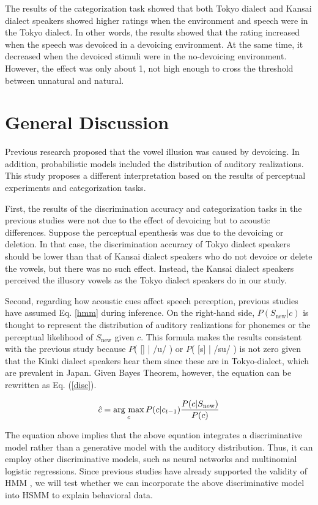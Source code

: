 \documentclass[a4paper,11pt,twocolumn]{article}
\newcommand{\argmax}{\mathop{\rm arg~max}\limits}
\begin{document}
The results of the categorization task showed that both Tokyo dialect and Kansai dialect speakers showed higher ratings when the environment and speech were in the Tokyo dialect. In other words, the results showed that the rating increased when the speech was devoiced in a devoicing environment. At the same time, it decreased when the devoiced stimuli were in the no-devoicing environment. However, the effect was only about 1, not high enough to cross the threshold between unnatural and natural.

\section{General Discussion}

Previous research proposed that the vowel illusion was caused by devoicing. In addition, probabilistic models included the distribution of auditory realizations. This study proposes a different interpretation based on the results of perceptual experiments and categorization tasks.

First, the results of the discrimination accuracy and categorization tasks in the previous studies were not due to the effect of devoicing but to acoustic differences. Suppose the perceptual epenthesis was due to the devoicing or deletion. In that case, the discrimination accuracy of Tokyo dialect speakers should be lower than that of Kansai dialect speakers who do not devoice or delete the vowels, but there was no such effect. Instead, the Kansai dialect speakers perceived the illusory vowels as the Tokyo dialect speakers do in our study.

Second, regarding how acoustic cues affect speech perception, previous studies \cite{wilson2013bayesian, kishiyama2021influence} have assumed Eq. \ref{hmm} during inference. On the right-hand side, $P(S_{\text{new}}|c)$ is thought to represent the distribution of auditory realizations for phonemes or the perceptual likelihood of $S_{\text{new}}$ given $c$. This formula makes the results consistent with the previous study because $P$( [\textsubring{\textturnm}] | /u/ ) or $P$( [s] | /su/ ) is not zero given that the Kinki dialect speakers hear them since these are in Tokyo-dialect, which are prevalent in Japan. Given Bayes Theorem, however, the equation can be rewritten as Eq. (\ref{disc}).

\begin{equation} \label{disc}
    \hat{c} = \argmax_{c} P(c | c_{t-1}) \frac{P(c|S_{\text{new}})}{P(c)}
\end{equation}

The equation above implies that the above equation integrates a discriminative model rather than a generative model with the auditory distribution. Thus, it can employ other discriminative models, such as neural networks and multinomial logistic regressions. Since previous studies have already supported the validity of HMM \cite{kishiyama2021influence}, we will test whether we can incorporate the above discriminative model into HSMM to explain behavioral data.




\end{document}
